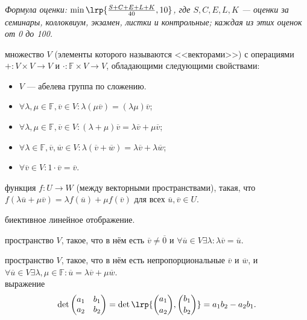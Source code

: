 \documentclass[12pt,a4paper]{article}
\begin{document}

\textit{Формула оценки: $\min\lrp{\frac{S+C+E+L+K}{40},10}$, где $S,C,E,L,K$ --- оценки за семинары, коллоквиум, экзамен, листки и контрольные; каждая из этих оценок от 0 до 100.}\\


 множество $V$ (элементы которого называются <<векторами>>) с операциями $+:V\times V\to V$ и $\cdot :\mathbb F\times V\to V$, обладающими следующими свойствами:

\begin{itemize}
	\item $V$ --- абелева группа по сложению.
	\item $\forall \lambda,\mu\in\mathbb F,\overline{v}\in V:\lambda(\mu \overline{v})=(\lambda\mu)\overline{v}$;
	\item $\forall \lambda,\mu\in\mathbb F,\overline{v}\in V:(\lambda+\mu)\overline{v}=\lambda \overline{v}+\mu \overline{v}$;
	\item $\forall\lambda\in\mathbb F,\overline{v},\overline{w}\in V:\lambda(\overline{v}+\overline{w})=\lambda \overline{v}+\lambda \overline{w}$;
	\item $\forall \overline{v}\in V:1\cdot \overline{v}=\overline{v}$.
\end{itemize}

 функция $f:U\to W$ (между векторными пространствами), такая, что $f(\lambda \overline{u}+\mu \overline{v})=\lambda f(\overline{u})+\mu f(\overline{v})$ для всех $\overline{u},\overline{v}\in U$.

 биективное линейное отображение.

 пространство $V$, такое, что в нём есть $\overline{v}\neq\overline{0}$ и $\forall \overline{u}\in V\exists \lambda:\lambda\overline{v}=\overline{u}$.

 пространство $V$, такое, что в нём есть непропорциональные $\overline{v}$ и $\overline{w}$, и $\forall \overline{u}\in V\exists \lambda,\mu\in \mathbb F:\overline{u}=\lambda\overline{v}+\mu\overline{w}$.\\

 выражение \[
	\det\begin{pmatrix}
		a_1 & b_1\\
		a_2 & b_2
	\end{pmatrix}=\det\lrp{\binom{a_1}{a_2},\binom{b_1}{b_2}}=a_1b_2-a_2b_1.
\]
\end{document}
